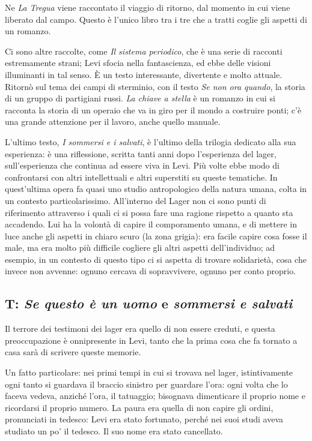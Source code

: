 Ne \textit{La Tregua} viene raccontato il viaggio di ritorno, dal momento in cui viene liberato dal campo. Questo è l'unico libro tra i tre che a tratti coglie gli aspetti di un romanzo.

Ci sono altre raccolte, come \textit{Il sistema periodico}, che è una serie di racconti estremamente strani; Levi sfocia nella fantascienza, ed ebbe delle visioni illuminanti in tal senso. È un testo interessante, divertente e molto attuale.
Ritornò sul tema dei campi di sterminio, con il testo \textit{Se non ora quando}, la storia di un gruppo di partigiani russi.
\textit{La chiave a stella} è un romanzo in cui si racconta la storia di un operaio che va in giro per il mondo a costruire ponti; c'è una grande attenzione per il lavoro, anche quello manuale.

L'ultimo testo, \textit{I sommersi e i salvati}, è l'ultimo della trilogia dedicato alla sua esperienza: è una riflessione, scritta tanti anni dopo l'esperienza del lager, sull'esperienza che continua ad essere viva in Levi. Più volte ebbe modo di confrontarsi con altri intellettuali e altri superstiti su queste tematiche. In quest'ultima opera fa quasi uno studio antropologico della natura umana, colta in un contesto particolarissimo. 
All'interno del Lager non ci sono punti di riferimento attraverso i quali ci si possa fare una ragione rispetto a quanto sta accadendo. Lui ha la volontà di capire il comporamento umana, e di mettere in luce anche gli aspetti in chiaro scuro (la zona grigia): era facile capire cosa fosse il male, ma era molto più difficile cogliere gli altri aspetti dell'individuo; ad esempio, in un contesto di questo tipo ci si aspetta di trovare solidarietà, cosa che invece non avvenne: ognuno cercava di sopravvivere, ognuno per conto proprio.

\subsection{T: \textit{Se questo è un uomo} e \textit{sommersi e salvati}}

Il terrore dei testimoni dei lager era quello di non essere creduti, e questa preoccupazione è onnipresente in Levi, tanto che la prima cosa che fa tornato a casa sarà di scrivere queste memorie.

Un fatto particolare: nei primi tempi in cui si trovava nel lager, istintivamente ogni tanto si guardava il braccio sinistro per guardare l'ora: ogni volta che lo faceva vedeva, anziché l'ora, il tatuaggio; bisognava dimenticare il proprio nome e ricordarsi il proprio numero. La paura era quella di non capire gli ordini, pronunciati in tedesco: Levi era stato fortunato, perché nei suoi studi aveva studiato un po' il tedesco. 
Il suo nome era stato cancellato.

